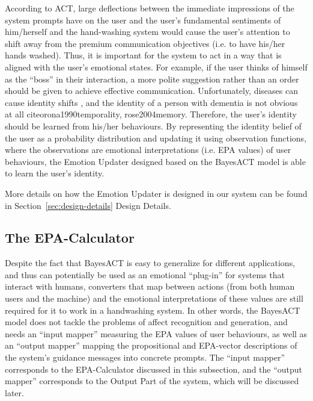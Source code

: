 According to ACT, large deflections between the immediate impressions of the system prompts have on the user and the user's fundamental sentiments of him/herself and the hand-washing system would cause the user's attention to shift away from the premium communication objectives (i.e. to have his/her hands washed). Thus, it is important for the system to act in a way that is aligned with the user's emotional states. For example, if the user thinks of himself as the ``boss'' in their interaction, a more polite suggestion rather than an order should be given to achieve effective communication. Unfortunately, diseases can cause identity shifts \cite{lively2011identity}, and the identity of a person with dementia is not obvious at all cite{orona1990temporality, rose2004memory}. Therefore, the user's identity should be learned from his/her behaviours. By representing the identity belief of the user as a probability distribution and updating it using observation functions, where the observations are emotional interpretations (i.e. EPA values) of user behaviours, the Emotion Updater designed based on the BayesACT model is able to learn the user's identity.

More details on how the Emotion Updater is designed in our system can be found in Section~\ref{sec:design-details} Design Details.

\subsection{The EPA-Calculator}

Despite the fact that BayesACT is easy to generalize for different applications, and thus can potentially be used as an emotional ``plug-in'' for systems that interact with humans, converters that map between actions (from both human users and the machine) and the emotional interpretations of these values are still required for it to work in a handwashing system. In other words, the BayesACT model does not tackle the problems of affect recognition and generation, and needs an ``input mapper'' measuring the EPA values of user behaviours, as well as an ``output mapper'' mapping the propositional and EPA-vector descriptions of the system's guidance messages into concrete prompts. The ``input mapper'' corresponds to the EPA-Calculator discussed in this subsection, and the ``output mapper'' corresponds to the Output Part of the system, which will be discussed later.

